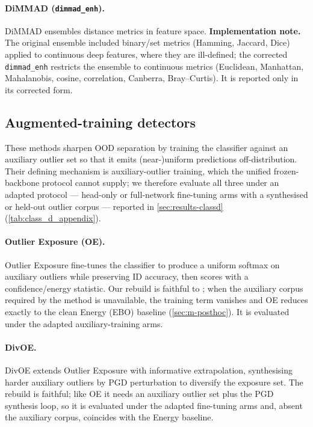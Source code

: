 \documentclass[11pt]{article}
\begin{document}
\paragraph{DiMMAD (\texttt{dimmad\_enh}).}
DiMMAD \citep{DiMMAD2025} ensembles distance metrics in feature space.
\textbf{Implementation note.} The original ensemble included binary/set metrics
(Hamming, Jaccard, Dice) applied to continuous deep features, where they are
ill-defined; the corrected \texttt{dimmad\_enh} restricts the ensemble to continuous
metrics (Euclidean, Manhattan, Mahalanobis, cosine, correlation, Canberra,
Bray--Curtis). It is reported only in its corrected form.

\subsection{Augmented-training detectors}\label{sec:m-augmented}
These methods sharpen OOD separation by training the classifier against an auxiliary
outlier set so that it emits (near-)uniform predictions off-distribution. Their
defining mechanism is auxiliary-outlier training, which the unified frozen-backbone
protocol cannot supply; we therefore evaluate all three under an adapted protocol ---
head-only or full-network fine-tuning arms with a synthesised or held-out outlier
corpus --- reported in \cref{sec:results-classd} (\cref{tab:class_d_appendix}).

\paragraph{Outlier Exposure (OE).}
Outlier Exposure \citep{Hendrycks2019} fine-tunes the classifier to produce a uniform
softmax on auxiliary outliers while preserving ID accuracy, then scores with a
confidence/energy statistic. Our rebuild is faithful to \citet{Hendrycks2019}; when
the auxiliary corpus required by the method is unavailable, the training term vanishes
and OE reduces exactly to the clean Energy (EBO) baseline (\cref{sec:m-posthoc}). It
is evaluated under the adapted auxiliary-training arms.

\paragraph{DivOE.}
DivOE \citep{Zhu2023} extends Outlier Exposure with informative extrapolation,
synthesising harder auxiliary outliers by PGD perturbation to diversify the exposure
set. The rebuild is faithful; like OE it needs an auxiliary outlier set plus the PGD
synthesis loop, so it is evaluated under the adapted fine-tuning arms and, absent the
auxiliary corpus, coincides with the Energy baseline.
\end{document}
